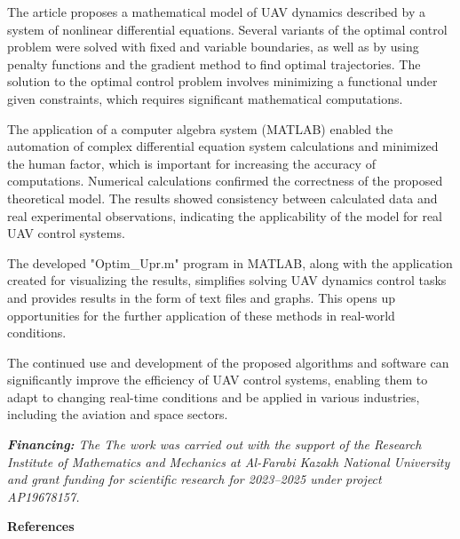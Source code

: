 The article proposes a mathematical model of UAV dynamics described by a
system of nonlinear differential equations. Several variants of the
optimal control problem were solved with fixed and variable boundaries,
as well as by using penalty functions and the gradient method to find
optimal trajectories. The solution to the optimal control problem
involves minimizing a functional under given constraints, which requires
significant mathematical computations.

The application of a computer algebra system (MATLAB) enabled the
automation of complex differential equation system calculations and
minimized the human factor, which is important for increasing the
accuracy of computations. Numerical calculations confirmed the
correctness of the proposed theoretical model. The results showed
consistency between calculated data and real experimental observations,
indicating the applicability of the model for real UAV control systems.

The developed "Optim\_Upr.m" program in MATLAB, along with the
application created for visualizing the results, simplifies solving UAV
dynamics control tasks and provides results in the form of text files
and graphs. This opens up opportunities for the further application of
these methods in real-world conditions.

The continued use and development of the proposed algorithms and
software can significantly improve the efficiency of UAV control
systems, enabling them to adapt to changing real-time conditions and be
applied in various industries, including the aviation and space sectors.

\emph{{\bfseries Financing:} The The work was carried out with the support
of the Research Institute of Mathematics and Mechanics at Al-Farabi
Kazakh National University and grant funding for scientific research for
2023--2025 under project AP19678157.}

\begin{center}
  {\bfseries References}
  \end{center}

